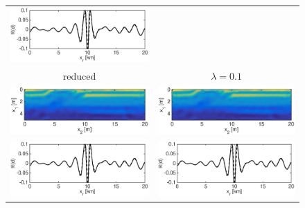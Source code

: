 \documentclass{iopart}
\begin{document}
\begin{figure}
\begin{tabular}{cc}
\includegraphics[scale=.3]{./figs/2D_overthrust1_m}\\
{\small reduced}&
{\small $\lambda=0.1$}\\
\includegraphics[scale=.3]{./figs/2D_overthrust1_i}&
\includegraphics[scale=.3]{./figs/2D_overthrust1_j}\\
\includegraphics[scale=.3]{./figs/2D_overthrust1_n}&
\includegraphics[scale=.3]{./figs/2D_overthrust1_o}\\

\end{tabular}
\end{figure}
\end{document}
